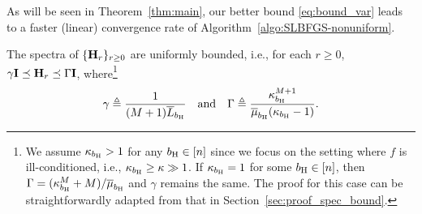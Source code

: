 \documentclass[10pt,twocolumn,journal]{IEEEtran}
\begin{document}
\begin{remark}
As will be seen in Theorem~\ref{thm:main}, our better bound \eqref{eq:bound_var} leads to a faster (linear) convergence rate of Algorithm~\ref{algo:SLBFGS-nonuniform}.
\end{remark}





\begin{lemma}\label{lem:spectral_bound}
The spectra of $\{\mathbf{H}_r\}_{r\ge 0}$ are uniformly bounded, i.e., for each $r\ge 0$, $\gamma\mathbf{I}\preceq \mathbf{H}_r \preceq \Gamma\mathbf{I}$, where\footnote{We assume $\kappa_{b_{\mathrm{H}}}>1$  for any ${b_{\mathrm{H}}}\in[n]$ since we focus on the setting where $f$ is ill-conditioned, i.e., $\kappa_{b_{\mathrm{H}}}\ge \kappa\gg 1$.
If $\kappa_{b_{\mathrm{H}}}=1$ for some ${b_{\mathrm{H}}}\in[n]$, then $\Gamma=(\kappa_{b_{\mathrm{H}}}^M+M)/\overline{\mu}_{b_{\mathrm{H}}}$ and $\gamma$ remains the same. The proof for this case can be straightforwardly adapted from that in Section~\ref{sec:proof_spec_bound}.\label{ft:kappa_gg_1}} 
\begin{equation}
\gamma \triangleq \frac{1}{(M+1)\overline{L}_{b_{\mathrm{H}}}} \quad\mbox{and}\quad \Gamma \triangleq \frac{\kappa_{b_{\mathrm{H}}}^{M+1}}{\overline{\mu}_{b_{\mathrm{H}}}(\kappa_{b_{\mathrm{H}}}-1)}.\label{eq:spec_bound}
\end{equation}
\end{lemma}
\end{document}
